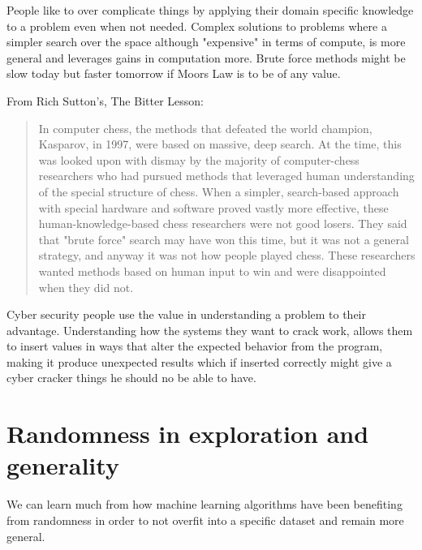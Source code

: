 \documentclass[a4paper]{article}
\begin{document}
People like to over complicate things by applying their domain specific knowledge to a problem 
even when not needed. 
Complex solutions to problems where a simpler search over the space 
although "expensive" in terms of compute, is more general and leverages gains in computation 
more. Brute force methods might be slow today but faster tomorrow if Moors Law is to be of 
any value.

From Rich Sutton's, The Bitter Lesson:
\begin{quotation}
In computer chess, the methods that defeated the world champion, Kasparov, in 1997, were based on massive, deep search. At the time, this was looked upon with dismay by the majority of computer-chess researchers who had pursued methods that leveraged human understanding of the special structure of chess. When a simpler, search-based approach with special hardware and software proved vastly more effective, these human-knowledge-based chess researchers were not good losers. They said that "brute force" search may have won this time, but it was not a general strategy, and anyway it was not how people played chess. These researchers wanted methods based on human input to win and were disappointed when they did not.
\end{quotation}


Cyber security people use the value in understanding a problem to their advantage. Understanding how the systems they want to crack work, allows them to insert values in ways that alter the expected behavior from the program, making it produce unexpected results which if inserted correctly might give a cyber cracker things he should no be able to have.  

\section{Randomness in exploration and generality}
We can learn much from how machine learning algorithms have been benefiting from randomness in order to not overfit into a specific dataset and remain more general.
\end{document}
